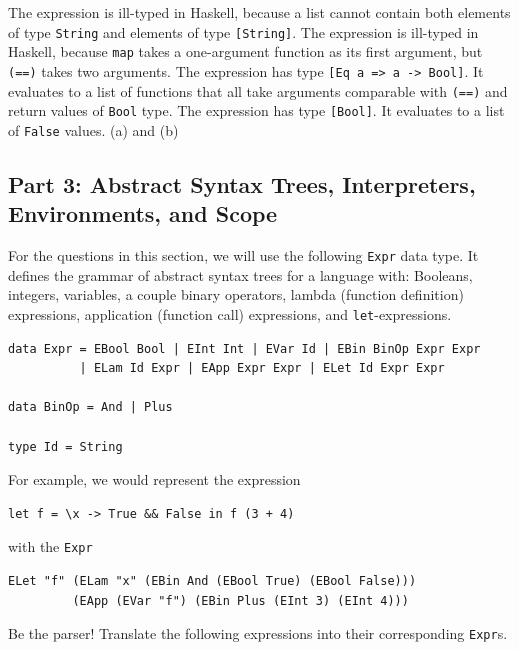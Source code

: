 \documentclass[addpoints]{exam}
\begin{document}
\begin{questions}
\begin{choices}
  \CorrectChoice The expression is ill-typed in Haskell, because a list cannot contain both elements of type \verb|String| and elements of type \verb|[String]|.
  \choice The expression is ill-typed in Haskell, because \verb|map| takes a one-argument function as its first argument, but \verb|(==)| takes two arguments.
  \choice The expression has type \verb|[Eq a => a -> Bool]|.  It evaluates to a list of functions that all take arguments comparable with \verb|(==)| and return values of \verb|Bool| type.
  \choice The expression has type \verb|[Bool]|.  It evaluates to a list of \verb|False| values.
  \choice (a) and (b)
\end{choices}

\newpage

\subsection*{\textbf{Part 3: Abstract Syntax Trees, Interpreters, Environments, and Scope}}

\noindent For the questions in this section, we will use the following \verb|Expr| data type.  It defines the grammar of abstract syntax trees for a language with: Booleans, integers, variables, a couple binary operators, lambda (function definition) expressions, application (function call) expressions, and \verb|let|-expressions.

\begin{verbatim}
data Expr = EBool Bool | EInt Int | EVar Id | EBin BinOp Expr Expr
          | ELam Id Expr | EApp Expr Expr | ELet Id Expr Expr

data BinOp = And | Plus

type Id = String
\end{verbatim}

For example, we would represent the expression

\begin{verbatim}
let f = \x -> True && False in f (3 + 4)
\end{verbatim}

with the \verb|Expr|

\begin{verbatim}
ELet "f" (ELam "x" (EBin And (EBool True) (EBool False)))
         (EApp (EVar "f") (EBin Plus (EInt 3) (EInt 4)))
\end{verbatim}

\question Be the parser! Translate the following expressions into their corresponding \verb|Expr|s.


\end{questions}
\end{document}
